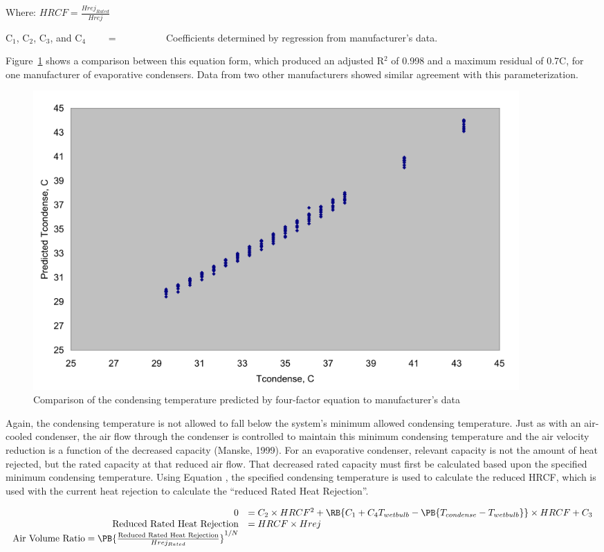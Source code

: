 Where: $HRCF = \frac{Hrej_{Rated}}{Hrej}$

C\(_{1}\), C\(_{2}\), C\(_{3}\), and C\(_{4}\)~~~~ = ~~~~~~~~~ Coefficients determined by regression from manufacturer's data.

Figure~\ref{fig:comparison-of-the-condensing-temperature} shows a comparison between this equation form, which produced an adjusted R\(^{2}\) of 0.998 and a maximum residual of 0.7C, for one manufacturer of evaporative condensers. Data from two other manufacturers showed similar agreement with this parameterization.

\begin{figure}[hbtp] %
\centering
\includegraphics[width=0.9\textwidth, height=0.9\textheight, keepaspectratio=true]{media/image6301.svg.png}
\caption{Comparison of the condensing temperature predicted by four-factor equation to manufacturer's data \protect \label{fig:comparison-of-the-condensing-temperature}}
\end{figure}

Again, the condensing temperature is not allowed to fall below the system's minimum allowed condensing temperature. Just as with an air-cooled condenser, the air flow through the condenser is controlled to maintain this minimum condensing temperature and the air velocity reduction is a function of the decreased capacity (Manske, 1999). For an evaporative condenser, relevant capacity is not the amount of heat rejected, but the rated capacity at that reduced air flow. That decreased rated capacity must first be calculated based upon the specified minimum condensing temperature. Using Equation , the specified condensing temperature is used to calculate the reduced HRCF, which is used with the current heat rejection to calculate the ``reduced Rated Heat Rejection''.

\begin{equation}
  \begin{array}{rl}
    0 &= C_2 \times HRCF^2 + \RB{C_1 + C_4 T_{wetbulb} - \PB{T_{condense} - T_{wetbulb}}} \times HRCF + C_3 \\
    \text{Reduced Rated Heat Rejection} &= HRCF \times Hrej \\
    \text{Air Volume Ratio} = \PB{\frac{\text{Reduced Rated Heat Rejection}}{Hrej_{Rated}}}^{1/N}
  \end{array}
\end{equation}

